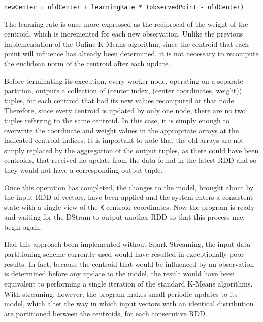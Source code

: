 \documentclass{l4proj}
\begin{document}
\begin{center}
\begin{BVerbatim}
newCenter = oldCenter + learningRate * (observedPoint - oldCenter)
\end{BVerbatim}
\end{center}

The learning rate is once more expressed as the reciprocal of the weight of the centroid, which is incremented for each new observation. Unlike the previous implementation of the Online K-Means algorithm, since the centroid that each point will influence has already been determined, it is not necessary to recompute the euclidean norm of the centroid after each update.

Before terminating its execution, every worker node, operating on a separate partition, outputs a collection of (center index, (center coordinates, weight)) tuples, for each centroid that had its new values recomputed at that node. Therefore, since every centroid is updated by only one node, there are no two tuples referring to the same centroid. In this case, it is simply enough to overwrite the coordinate and weight values in the appropriate arrays at the indicated centroid indices. It is important to note that the old arrays are not simply replaced by the aggregation of the output tuples, as there could have been centroids, that received no update from the data found in the latest RDD and so they would not have a corresponding output tuple.

Once this operation has completed, the changes to the model, brought about by the input RDD of vectors, have been applied and the system enters a consistent state with a single view of the \texttt{K} centroid coordinates. Now the program is ready and waiting for the DStram to output another RDD so that this process may begin again.

Had this approach been implemented without Spark Streaming, the input data partitioning scheme currently used would have resulted in exceptionally poor results. In fact, because the centroid that would be influenced by an observation is determined before any update to the model, the result would have been equivalent to performing a single iteration of the standard K-Means algorithms. With streaming, however, the program makes small periodic updates to its model, which alter the way in which input vectors with an identical distribution are partitioned between the centroids, for each consecutive RDD.\\\\
\end{document}
